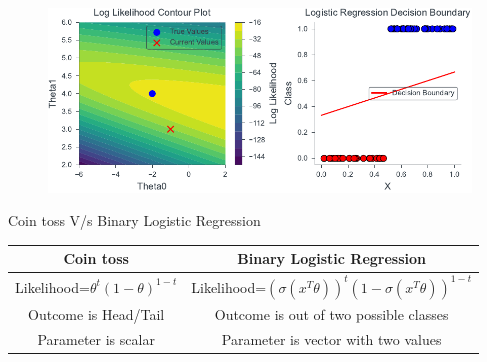 \documentclass{beamer}
\begin{document}
\begin{frame}
    \begin{figure}
                \centerline{\includegraphics[scale=0.8]{../figures/mle/log_reg_slider_3.pdf}}
\end{figure}
\end{frame}

\begin{frame}{Coin toss V/s Binary Logistic Regression}
\begin{center}
    \begin{tabular}{|c|c|}
    \hline
    \textbf{Coin toss} & \textbf{Binary Logistic Regression} \\
    \hline
    Likelihood=$\theta^{t}(1-\theta)^{1-t}$& Likelihood=$(\sigma(x^T\theta))^t(1-\sigma(x^T\theta))^{1-t}$ \\
    \pause
    Outcome is Head/Tail & Outcome is out of two possible classes \\
    \pause
    Parameter is scalar & Parameter is vector with two values\\
    \hline
  \end{tabular}
\end{center}    
\end{frame}
\end{document}
